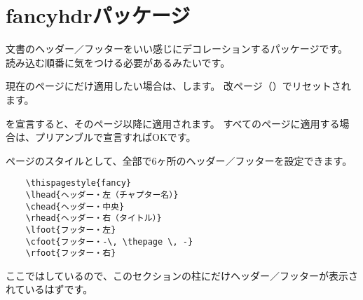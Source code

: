\section{fancyhdrパッケージ}

\thispagestyle{fancy}
\cfoot{-\, \thepage \, -}

文書のヘッダー／フッターをいい感じにデコレーションするパッケージです。
読み込む順番に気をつける必要があるみたいです。

現在のページにだけ適用したい場合は、\texttt{\thispagestyle{fancy}}します。
改ページ（\texttt{\newpage}）でリセットされます。

\texttt{\pagestyle{fancy}}を宣言すると、そのページ以降に適用されます。
すべてのページに適用する場合は、プリアンブルで宣言すればOKです。

ページのスタイルとして、全部で6ヶ所のヘッダー／フッターを設定できます。

\begin{verbatim}
    \thispagestyle{fancy}
    \lhead{ヘッダー・左（チャプター名）}
    \chead{ヘッダー・中央}
    \rhead{ヘッダー・右（タイトル）}
    \lfoot{フッター・左}
    \cfoot{フッター・-\, \thepage \, -}
    \rfoot{フッター・右}
\end{verbatim}

ここでは\texttt{\thispagestyle{fancy}}しているので、このセクションの柱にだけヘッダー／フッターが表示されているはずです。
